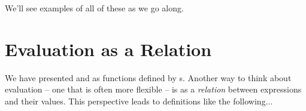 \documentclass[12pt]{report}
\begin{document}
    We'll see examples of all of these as we go along. 
\begin{coqdoccode}
\coqdocemptyline
\end{coqdoccode}
\section{Evaluation as a Relation}



 We have presented  and  as functions defined by
    s.  Another way to think about evaluation -- one that is
    often more flexible -- is as a \textit{relation} between expressions and
    their values.  This perspective leads to  definitions
    like the following... 
\end{document}
